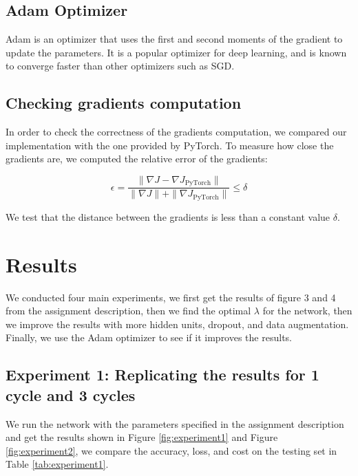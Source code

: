 \documentclass{article}
\begin{document}
\subsection{Adam Optimizer}

Adam is an optimizer that uses the first and second moments of the gradient to update the parameters. It is a popular optimizer for deep learning, and is known to converge faster than other optimizers such as SGD.


\subsection{Checking gradients computation}

In order to check the correctness of the gradients computation, we compared our implementation with the one provided by PyTorch. To measure how close the gradients are, we computed the relative error of the gradients:

\begin{equation}
    \epsilon = \frac{\| \nabla J - \nabla J_{\text{PyTorch}} \|}{\| \nabla J \| + \| \nabla J_{\text{PyTorch}} \|} \leq \delta
\end{equation}

We test that the distance between the gradients is less than a constant value $\delta$.

\newpage

\section{Results}
We conducted four main experiments, we first get the results of figure 3 and 4 from the assignment description, then we find the optimal $\lambda$ for the network, then we improve the results with more hidden units, dropout, and data augmentation. Finally, we use the Adam optimizer to see if it improves the results.

\subsection{Experiment 1: Replicating the results for 1 cycle and 3 cycles}

We run the network with the parameters specified in the assignment description and get the results shown in Figure \ref{fig:experiment1} and Figure \ref{fig:experiment2}, we compare the accuracy, loss, and cost on the testing set in Table \ref{tab:experiment1}.
\end{document}
